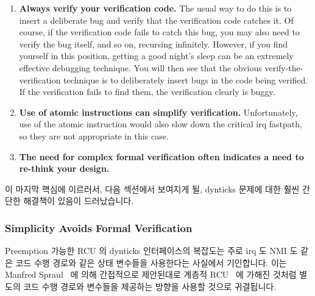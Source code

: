 \begin{enumerate}
\item	{\bf Always verify your verification code.}
	The usual way to do this is to insert a deliberate bug
	and verify that the verification code catches it.  Of course,
	if the verification code fails to catch this bug, you may also
	need to verify the bug itself, and so on, recursing infinitely.
	However, if you find yourself in this position,
	getting a good night's sleep
	can be an extremely effective debugging technique.
	You will then see that the obvious verify-the-verification
	technique is to deliberately insert bugs in the code being
	verified.
	If the verification fails to find them, the verification clearly
	is buggy.
\item	{\bf Use of atomic instructions can simplify verification.}
	Unfortunately, use of the  atomic instruction
	would also slow down the critical irq fastpath, so they
	are not appropriate in this case.
\item	{\bf The need for complex formal verification often indicates
	a need to re-think your design.}
\fi
\end{enumerate}

이 마지막 핵심에 이르러서, 다음 섹션에서 보여지게 될, dynticks 문제에 대한 훨씬
간단한 해결책이 있음이 드러났습니다.
\iffalse

To this last point, it turn out that there is a much simpler solution to
the dynticks problem, which is presented in the next section.
\fi

\subsubsection{Simplicity Avoids Formal Verification}
\label{sec:formal:Simplicity Avoids Formal Verification}

Preemption 가능한 RCU 의 dynticks 인터페이스의 복잡도는 주로 irq 도 NMI 도 같은
코드 수행 경로와 같은 상태 변수들을 사용한다는 사실에서 기인합니다.
이는
Manfred Spraul~\cite{ManfredSpraul2008StateMachineRCU} 에 의해 간접적으로
제안된대로 계층적 RCU~\cite{PaulEMcKenney2008HierarchicalRCU} 에 가해진 것처럼
별도의 코드 수행 경로와 변수들을 제공하는 방향을 사용할 것으로 귀결됩니다.
\iffalse

The complexity of the dynticks interface for preemptible RCU is primarily
due to the fact that both irqs and NMIs use the same code path and the
same state variables.
This leads to the notion of providing separate code paths and variables
for irqs and NMIs, as has been done for
hierarchical RCU~\cite{PaulEMcKenney2008HierarchicalRCU}
as indirectly suggested by
Manfred Spraul~\cite{ManfredSpraul2008StateMachineRCU}.
\fi

